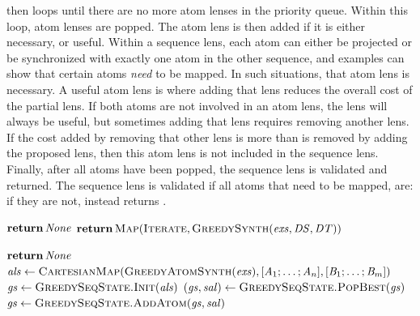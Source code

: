 \documentclass[acmsmall,screen,anonymous]{acmart}
\begin{document}
\GreedySeqSynth then loops until there are no more atom lenses in the priority
queue. Within this loop, atom lenses are popped. The atom lens is then added if
it is either necessary, or useful. Within a sequence lens, each atom can either
be projected or be synchronized with exactly one atom in the other sequence, and
examples can show that certain atoms \emph{need} to be mapped. In such
situations, that atom lens is necessary. A useful atom lens is where adding that
lens reduces the overall cost of the partial lens. If both atoms are not
involved in an atom lens, the lens will always be useful, but sometimes adding
that lens requires removing another lens. If the cost added by removing that
other lens is more than is removed by adding the proposed lens, then this atom
lens is not included in the sequence lens. Finally, after all atoms have been
popped, the sequence lens is validated and returned. The sequence lens is
validated if all atoms that need to be mapped, are: if they are not,
 instead returns \None.

\begin{algorithm}
  \caption{\GreedySeqSynth}
  \label{alg:greedyseqsynth}
  \begin{algorithmic}[1]
    \State $\ReturnVal{\None}$
    \Else
    \State $\ReturnVal{\Call{Map}{\PCF{Iterate},\GreedySynth(\Examples,\DNFRegex,\DNFRegexAlt)}}$
    \EndIf
    \EndFunction

    \State $\ReturnVal{\None}$
    \EndIf
    \State $\ALS \gets
    \Call{\CartesianMap}{\AtomSynth(\Examples),\ListOf{\Atom_1;\ldots;\Atom_n},\ListOf{\AtomAlt_1;\ldots;\AtomAlt_m}}$
    \State $\GreedyState \gets \Call{GreedySeqState.Init}{\ALS}$
    \State $(\GreedyState,\SAtomLens) \gets
    \Call{GreedySeqState.PopBest}{\GreedyState}$
    \State $\GreedyState \gets \Call{GreedySeqState.AddAtom}{\GreedyState,\SAtomLens}$
    \EndIf
    \EndWhile
    \EndFunction
  \end{algorithmic}
\end{algorithm}
\end{document}

